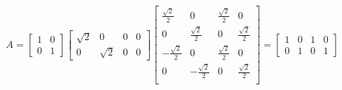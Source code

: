 \documentclass{article}
\begin{document}
$$
A =
\begin{bmatrix}
1 & 0 \\
0 & 1
\end{bmatrix}
\begin{bmatrix}
\sqrt{2} & 0 & 0 & 0 \\
0 & \sqrt{2} & 0 & 0
\end{bmatrix}
\begin{bmatrix}
\frac{\sqrt{2}}{2} & 0 & \frac{\sqrt{2}}{2} & 0 \\
0 & \frac{\sqrt{2}}{2} & 0 & \frac{\sqrt{2}}{2} \\
-\frac{\sqrt{2}}{2} & 0 & \frac{\sqrt{2}}{2} & 0 \\
0 & -\frac{\sqrt{2}}{2} & 0 & \frac{\sqrt{2}}{2} \\
\end{bmatrix}
=
\begin{bmatrix}
1 & 0 & 1 & 0 \\
0 & 1 & 0 & 1
\end{bmatrix}
$$
\end{document}
